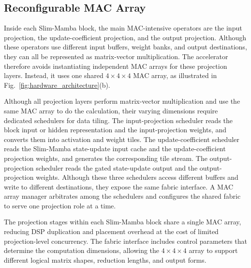 \documentclass[lettersize,journal]{IEEEtran}
\begin{document}
\subsection{Reconfigurable MAC Array}

Inside each Slim-Mamba block, the main MAC-intensive operators are the input
projection, the update-coefficient projection, and the output
projection. Although these operators use different input buffers, weight banks,
and output destinations, they can all be represented as matrix-vector
multiplication. The accelerator therefore avoids instantiating independent MAC arrays for
these projection layers. Instead, it uses
one shared $4\times4\times4$ MAC array, as illustrated in
Fig.~\ref{fig:hardware_architecture}(b).

Although all projection layers perform matrix-vector multiplication and use the same MAC array to do the calculation, their varying dimensions require dedicated schedulers for data tiling. The
input-projection scheduler reads the block input or hidden representation and
the input-projection weights, and converts them into activation and weight tiles.
The update-coefficient scheduler reads the Slim-Mamba state-update input cache and the update-coefficient
projection weights, and generates the corresponding tile stream. The
output-projection scheduler reads the gated state-update output and the output-projection
weights. Although these three schedulers access different buffers and write to
different destinations, they expose the same fabric interface. A MAC array
manager arbitrates among the schedulers and configures the shared fabric to
serve one projection role at a time.

The projection stages within each Slim-Mamba block share a single MAC array, reducing DSP duplication and placement overhead at the cost of limited projection-level concurrency. The fabric interface includes control parameters that determine the computation dimensions, allowing the $4\times4\times4$ array to support
different logical matrix shapes, reduction lengths, and output forms. 

\end{document}
